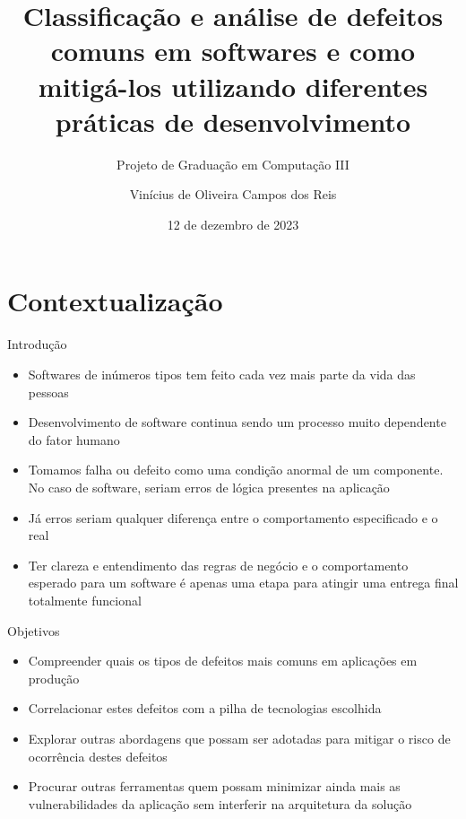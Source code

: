 \documentclass[brazilian]{beamer}
\author{Vinícius de Oliveira Campos dos Reis}
\title[Classificação e análise de defeitos]{Classificação e análise de defeitos comuns em softwares e como mitigá-los utilizando diferentes práticas de desenvolvimento}
\subtitle{Projeto de Graduação em Computação III}
\institute{UFABC}
\date{12 de dezembro de 2023}
\begin{document}
\begin{frame}
    \titlepage
\end{frame}


\section{Contextualização}

\begin{frame}{Introdução}
    \begin{itemize}
        \item Softwares de inúmeros tipos tem feito cada vez mais parte da vida das pessoas
        \item Desenvolvimento de software continua sendo um processo muito dependente do fator humano
        \item Tomamos falha ou defeito como uma condição anormal de um componente. No caso de software, seriam erros de lógica presentes na aplicação
        \item Já erros seriam qualquer diferença entre o comportamento especificado e o real
        \item Ter clareza e entendimento das regras de negócio e o comportamento esperado para um software é apenas uma etapa para atingir uma entrega final totalmente funcional
    \end{itemize}
\end{frame}

\begin{frame}{Objetivos}
    \begin{itemize}
        \item Compreender quais os tipos de defeitos mais comuns em aplicações em produção
        \item Correlacionar estes defeitos com a pilha de tecnologias escolhida
        \item Explorar outras abordagens que possam ser adotadas para mitigar o risco de ocorrência destes defeitos
        \item Procurar outras ferramentas quem possam minimizar ainda mais as vulnerabilidades da aplicação sem interferir na arquitetura da solução
    \end{itemize}
\end{frame}
\end{document}
